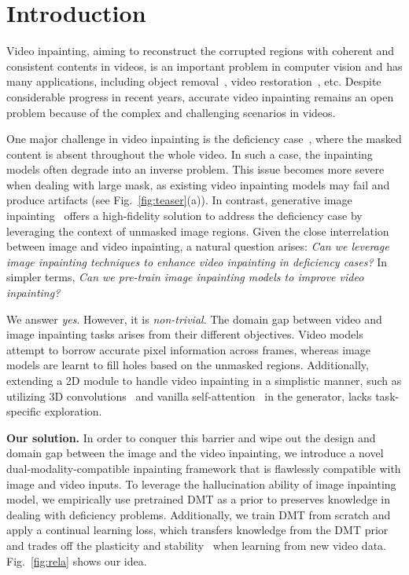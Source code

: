 \documentclass[10pt,twocolumn,letterpaper]{article}
\begin{document}
\section{Introduction}


Video inpainting, aiming to reconstruct the corrupted regions with coherent and consistent contents in videos, is an important problem in computer vision and has many applications, including object removal~\cite{kim19deep,chang19free,li22e2fgvi}, video restoration~\cite{lee19copy}, etc. Despite considerable progress in recent years, accurate video inpainting remains an open problem because of the complex and challenging scenarios in videos.

One major challenge in video inpainting is the deficiency case~\cite{ouyang21iivi}, where the masked content is absent throughout the whole video. 
In such a case, the inpainting models often degrade into an inverse problem. This issue becomes more severe when dealing with large mask, as existing video inpainting models may fail and produce artifacts (see Fig.~\ref{fig:teaser}(a)). In contrast, generative image inpainting~\cite{zhao21comod,rombach22ldm,yu22invertfill,jain22fcf} offers a high-fidelity solution to address the deficiency case by leveraging the context of unmasked image regions. Given the close interrelation between image and video inpainting, a natural question arises: \emph{Can we leverage image inpainting techniques to enhance video inpainting in deficiency cases?} In simpler terms, \emph{Can we pre-train image inpainting models to improve video inpainting?}


We answer \emph{yes}. However, it is \emph{non-trivial}. The domain gap between video and image inpainting tasks arises from their different objectives. Video models attempt to borrow accurate pixel information across frames, whereas image models are learnt to fill holes based on the unmasked regions. Additionally, extending a 2D module to handle video inpainting in a simplistic manner, such as utilizing 3D convolutions~\cite{chang19free,wang19video} and vanilla self-attention~\cite{zeng20sttn,liu21fuseformer} in the generator, lacks task-specific exploration.

\noindent
\textbf{Our solution.} In order to conquer this barrier and wipe out the design and domain gap between the image and the video inpainting, we introduce a novel dual-modality-compatible inpainting framework that is flawlessly compatible with image and video inputs. To leverage the hallucination ability of image inpainting model, we empirically use pretrained DMT as a prior to preserves knowledge in dealing with deficiency problems. Additionally, we train DMT from scratch and apply a continual learning loss, which transfers knowledge from the DMT prior and trades off the plasticity and stability~\cite{mermillod2013stability} when learning from new video data. Fig.~\ref{fig:rela} shows our idea. 
\end{document}
